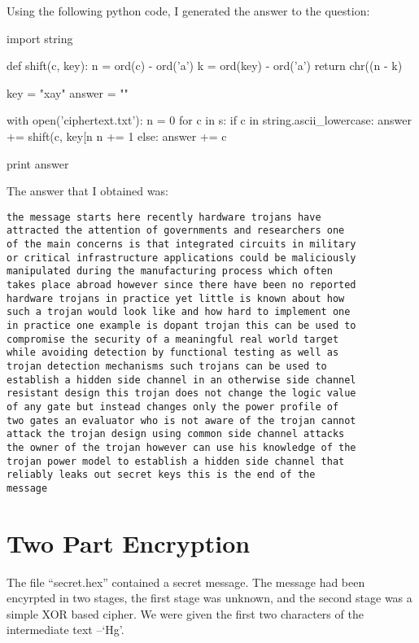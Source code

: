 \documentclass[12pt,a4paper,twoside]{article}
\begin{document}
Using the following python code, I generated the answer to the question:

\begin{python}
import string

def shift(c, key):
    n = ord(c) - ord('a')
    k = ord(key) - ord('a')
    return chr((n - k) %

key = "xay"
answer = ""

with open('ciphertext.txt'):
    n = 0
    for c in s:
        if c in string.ascii_lowercase:
            answer += shift(c, key[n%
            n += 1
        else:
            answer += c
        
print answer
\end{python}

The answer that I obtained was: 

\begin{lstlisting}
the message starts here recently hardware trojans have
attracted the attention of governments and researchers one
of the main concerns is that integrated circuits in military
or critical infrastructure applications could be maliciously
manipulated during the manufacturing process which often
takes place abroad however since there have been no reported
hardware trojans in practice yet little is known about how
such a trojan would look like and how hard to implement one
in practice one example is dopant trojan this can be used to
compromise the security of a meaningful real world target
while avoiding detection by functional testing as well as
trojan detection mechanisms such trojans can be used to
establish a hidden side channel in an otherwise side channel
resistant design this trojan does not change the logic value
of any gate but instead changes only the power profile of
two gates an evaluator who is not aware of the trojan cannot
attack the trojan design using common side channel attacks
the owner of the trojan however can use his knowledge of the
trojan power model to establish a hidden side channel that
reliably leaks out secret keys this is the end of the
message
\end{lstlisting}
 
\section{Two Part Encryption}
The file ``secret.hex'' contained a secret message. The message had been
encyrpted in two stages, the first stage was unknown, and the second stage was
a simple XOR based cipher. We were given the first two characters of the
intermediate text --`Hg'.
\end{document}
